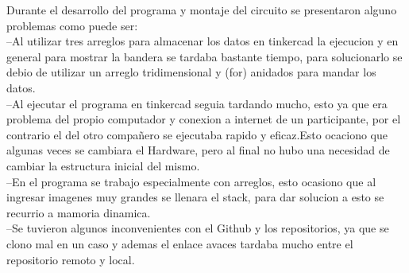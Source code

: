 \documentclass{article}
\begin{document}
Durante el desarrollo del programa y montaje del circuito se presentaron alguno problemas como puede ser:\\

--Al utilizar tres arreglos para almacenar los datos en tinkercad la ejecucion y en general para mostrar la bandera se tardaba bastante tiempo, para solucionarlo se debio de utilizar un arreglo tridimensional y (for)  anidados para mandar los datos.\\

--Al ejecutar el programa en tinkercad seguia tardando mucho, esto ya que era problema del propio computador y conexion a internet de un participante, por el contrario el del otro compañero se ejecutaba rapido y eficaz.Esto ocaciono que algunas veces se cambiara el Hardware, pero al final no hubo una necesidad de cambiar la estructura inicial del mismo.\\

--En el programa se trabajo especialmente con arreglos, esto ocasiono que al ingresar imagenes muy grandes se llenara el stack, para dar solucion a esto se recurrio a mamoria dinamica.\\

--Se tuvieron algunos inconvenientes con el Github y los repositorios, ya que se clono mal en un caso y ademas el enlace avaces tardaba mucho entre el repositorio remoto y local.\\
\end{document}

